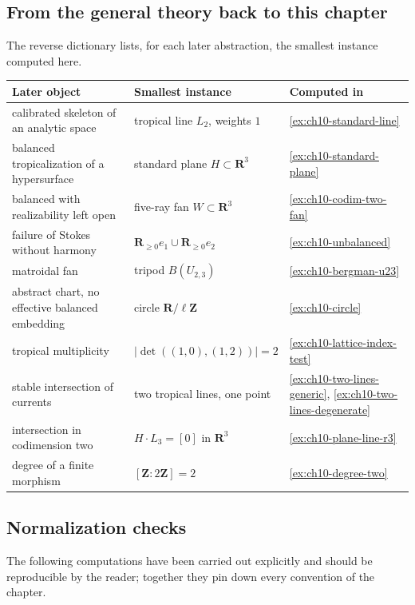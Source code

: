 \subsection{From the general theory back to this chapter}

The reverse dictionary lists, for each later abstraction, the smallest
instance computed here.

\begin{center}
\small
\begin{tabular}{p{}|p{}|p{}}
\textbf{Later object}&\textbf{Smallest instance}&\textbf{Computed in}\\ \hline
calibrated skeleton of an analytic space
  &tropical line $L_2$, weights $1$
  &\cref{ex:ch10-standard-line}\\
balanced tropicalization of a hypersurface
  &standard plane $H\subset\mathbf R^3$
  &\cref{ex:ch10-standard-plane}\\
balanced with realizability left open
  &five-ray fan $W\subset\mathbf R^3$
  &\cref{ex:ch10-codim-two-fan}\\
failure of Stokes without harmony
  &$\mathbf R_{\geq0}e_1\cup\mathbf R_{\geq0}e_2$
  &\cref{ex:ch10-unbalanced}\\
matroidal fan
  &tripod $B(U_{2,3})$
  &\cref{ex:ch10-bergman-u23}\\
abstract chart, no effective balanced embedding
  &circle $\mathbf R/\ell\mathbf Z$
  &\cref{ex:ch10-circle}\\
tropical multiplicity
  &$|\det((1,0),(1,2))|=2$
  &\cref{ex:ch10-lattice-index-test}\\
stable intersection of currents
  &two tropical lines, one point
  &\cref{ex:ch10-two-lines-generic},
   \cref{ex:ch10-two-lines-degenerate}\\
intersection in codimension two
  &$H\cdot L_3=[0]$ in $\mathbf R^3$
  &\cref{ex:ch10-plane-line-r3}\\
degree of a finite morphism
  &$[\mathbf Z:2\mathbf Z]=2$
  &\cref{ex:ch10-degree-two}
\end{tabular}
\end{center}

\subsection{Normalization checks}

The following computations have been carried out explicitly and should be
reproducible by the reader; together they pin down every convention of the
chapter.

